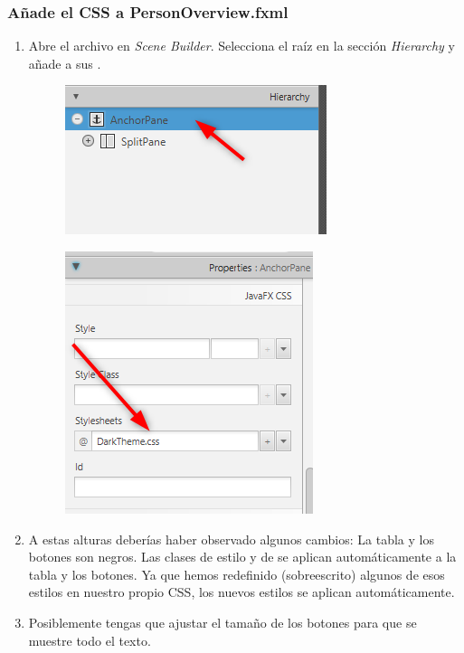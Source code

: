 \subsubsection*{Añade el CSS a PersonOverview.fxml}
\begin{enumerate}
    \item Abre el archivo  en \textit{Scene Builder}. Selecciona el  raíz 
    en la sección \textit{Hierarchy} y añade  a sus .
    \begin{figure}[H]
        \includegraphics{img/6-5-AnchorPane.png}
    \end{figure}
    \begin{figure}[H]
        \includegraphics{img/6-6-SelectDark.png}
    \end{figure}
    \item A estas alturas deberías haber observado algunos cambios: La tabla y los botones son negros. 
    Las clases de estilo  y  de  se aplican automáticamente a la tabla y 
    los botones. Ya que hemos redefinido (sobreescrito) algunos de esos estilos en nuestro propio CSS, 
    los nuevos estilos se aplican automáticamente.
    \item Posiblemente tengas que ajustar el tamaño de los botones para que se muestre todo el texto.

\end{enumerate}
